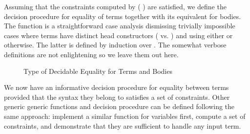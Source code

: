 Assuming that the constraints computed by {( )} are
satisfied, we define the decision procedure for equality of terms together
with its equivalent for bodies. The function 
is a straightforward case analysis dismissing trivially impossible cases
where terms have distinct head constructors ( vs. )
and using either  or 
otherwise. The latter is defined by induction over . The somewhat
verbose definitions are not enlightening so we leave them out here.


\begin{figure}[h]
\caption{Type of Decidable Equality for Terms and Bodies}\label{fig:eqconstraints}
\end{figure}

We now have an informative decision procedure for equality between terms
provided that the syntax they belong to satisfies a set of constraints.
Other generic generic functions and decision procedure can be defined
following the same approach: implement a similar function for variables
first, compute a set of constraints, and demonstrate that they are
sufficient to handle any input term.
